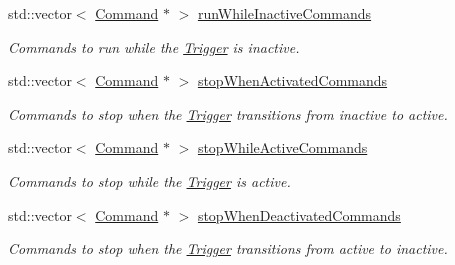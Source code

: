 \begin{DoxyCompactItemize}
\mbox{\label{classlib_iterative_robot_1_1_trigger_ab2abdd098fa750a75f175254aeb02af6}} 
std\+::vector$<$ \mbox{\hyperlink{classlib_iterative_robot_1_1_command}{Command}} $\ast$ $>$ \mbox{\hyperlink{classlib_iterative_robot_1_1_trigger_ab2abdd098fa750a75f175254aeb02af6}{run\+While\+Inactive\+Commands}}
\begin{DoxyCompactList}\small\item\em Commands to run while the \mbox{\hyperlink{classlib_iterative_robot_1_1_trigger}{Trigger}} is inactive. \end{DoxyCompactList}\item 
\mbox{\label{classlib_iterative_robot_1_1_trigger_a5d326d8b356575d12f7b6577862d3065}} 
std\+::vector$<$ \mbox{\hyperlink{classlib_iterative_robot_1_1_command}{Command}} $\ast$ $>$ \mbox{\hyperlink{classlib_iterative_robot_1_1_trigger_a5d326d8b356575d12f7b6577862d3065}{stop\+When\+Activated\+Commands}}
\begin{DoxyCompactList}\small\item\em Commands to stop when the \mbox{\hyperlink{classlib_iterative_robot_1_1_trigger}{Trigger}} transitions from inactive to active. \end{DoxyCompactList}\item 
\mbox{\label{classlib_iterative_robot_1_1_trigger_a183904873b9167490e189d63faa4e1d8}} 
std\+::vector$<$ \mbox{\hyperlink{classlib_iterative_robot_1_1_command}{Command}} $\ast$ $>$ \mbox{\hyperlink{classlib_iterative_robot_1_1_trigger_a183904873b9167490e189d63faa4e1d8}{stop\+While\+Active\+Commands}}
\begin{DoxyCompactList}\small\item\em Commands to stop while the \mbox{\hyperlink{classlib_iterative_robot_1_1_trigger}{Trigger}} is active. \end{DoxyCompactList}\item 
\mbox{\label{classlib_iterative_robot_1_1_trigger_ae715bc91bd9aabafa1b97aace80d33c8}} 
std\+::vector$<$ \mbox{\hyperlink{classlib_iterative_robot_1_1_command}{Command}} $\ast$ $>$ \mbox{\hyperlink{classlib_iterative_robot_1_1_trigger_ae715bc91bd9aabafa1b97aace80d33c8}{stop\+When\+Deactivated\+Commands}}
\begin{DoxyCompactList}\small\item\em Commands to stop when the \mbox{\hyperlink{classlib_iterative_robot_1_1_trigger}{Trigger}} transitions from active to inactive. \end{DoxyCompactList}\item 

\end{DoxyCompactItemize}
